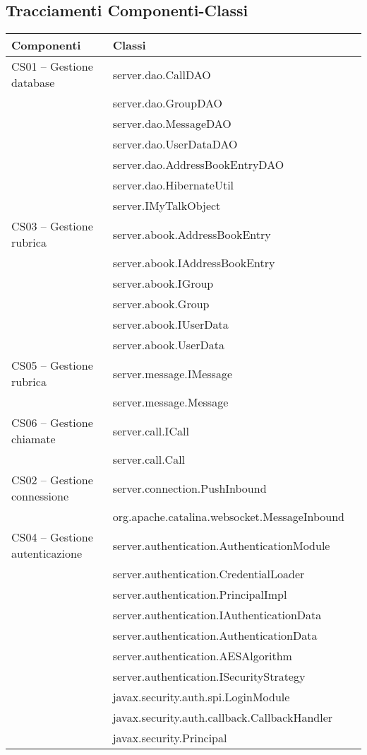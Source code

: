 \subsection{Tracciamenti Componenti-Classi}\label{sec:tracCompClass}

\begin{center}
\begin{longtable}{lp{}l}
\toprule Componenti & Classi\\
\midrule
CS01 -- Gestione database & server.dao.CallDAO\\
& server.dao.GroupDAO\\
& server.dao.MessageDAO\\
& server.dao.UserDataDAO\\
& server.dao.AddressBookEntryDAO\\
& server.dao.HibernateUtil\\
& server.IMyTalkObject\\

CS03 -- Gestione rubrica & server.abook.AddressBookEntry\\
& server.abook.IAddressBookEntry\\
& server.abook.IGroup\\
& server.abook.Group\\
& server.abook.IUserData\\
& server.abook.UserData\\

CS05 -- Gestione rubrica & server.message.IMessage\\
& server.message.Message\\

CS06 -- Gestione chiamate & server.call.ICall\\
& server.call.Call\\

CS02 -- Gestione connessione & server.connection.PushInbound\\
& org.apache.catalina.websocket.MessageInbound\\

CS04 -- Gestione autenticazione & server.authentication.AuthenticationModule\\
& server.authentication.CredentialLoader\\
& server.authentication.PrincipalImpl\\
& server.authentication.IAuthenticationData\\
& server.authentication.AuthenticationData\\
& server.authentication.AESAlgorithm\\
& server.authentication.ISecurityStrategy\\
& javax.security.auth.spi.LoginModule\\
& javax.security.auth.callback.CallbackHandler\\
& javax.security.Principal\\


\end{longtable}
\end{center}
